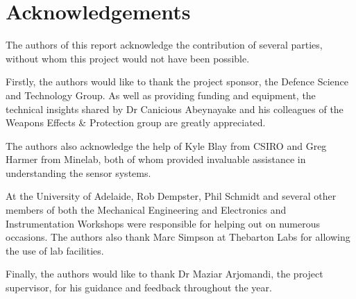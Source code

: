 \documentclass[main.tex]{subfiles}
\begin{document}
{}	%
\chapter*{Acknowledgements} 
The authors of this report acknowledge the contribution of several parties, without whom this project would not have been possible.

Firstly, the authors would like to thank the project sponsor, the Defence Science and Technology Group. As well as providing funding and equipment, the technical insights shared by Dr Canicious Abeynayake and his colleagues of the Weapons Effects \& Protection group are greatly appreciated. 

The authors also acknowledge the help of Kyle Blay from CSIRO and Greg Harmer from Minelab, both of whom provided invaluable assistance in understanding the sensor systems.

At the University of Adelaide, Rob Dempster, Phil Schmidt and several other members of both the Mechanical Engineering and Electronics and Instrumentation Workshops were responsible for helping out on numerous occasions. The authors also thank Marc Simpson at Thebarton Labs for allowing the use of lab facilities. 

Finally, the authors would like to thank Dr Maziar Arjomandi, the project supervisor, for his guidance and feedback throughout the year. 
\newpage

{}	%
\renewcommand{\baselinestretch}{1.2}\normalsize 	%
\tableofcontents
\renewcommand{\baselinestretch}{1.3}\normalsize 	%
\newpage

{}	%
\listoffigures
\newpage

{}	%
\listoftables
\newpage


\printnomenclature
\newpage
\end{document}
